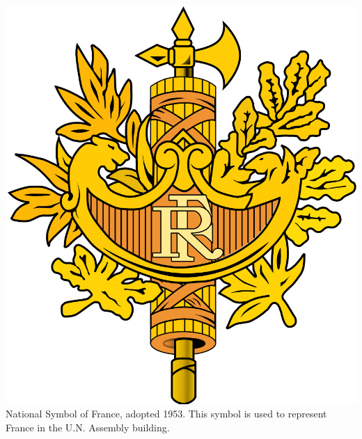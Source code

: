 \begin{frame}
    \centering
    \includegraphics[height=.8\textheight]{img/fasces/french-republic-symbol.png} \\
    National Symbol of France, adopted 1953. This symbol is used to represent France in the U.N. Assembly building. \\
\end{frame}
